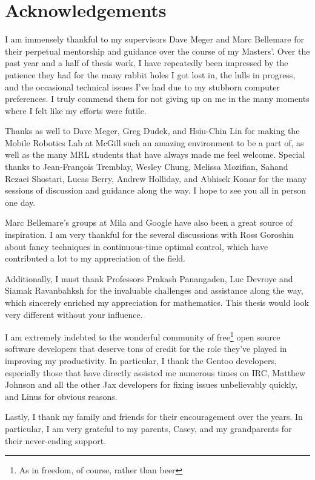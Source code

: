 \section*{Acknowledgements}
I am immensely thankful to my supervisors Dave Meger and Marc Bellemare for
their perpetual mentorship and guidance over the course of my Masters'. Over the
past year and a half of thesis work, I have repeatedly been impressed by
the patience they had for the many rabbit holes I got lost in, the lulls in
progress, and the occasional technical issues I've had due to my stubborn
computer preferences. I truly commend them for not giving up on me in the many
moments where I felt like my efforts were futile.

Thanks as well to Dave Meger, Greg Dudek, and Hsiu-Chin Lin for making the
Mobile Robotics Lab at McGill such an amazing environment to be a part of, as
well as the many MRL students that have always made me feel welcome. Special
thanks to Jean-François Tremblay, Wesley Chung, Melissa Mozifian, Sahand Rezaei
Shostari, Lucas Berry, Andrew Holliday, and Abhisek Konar for the many sessions
of discussion and guidance along the way. I hope to see you all in person one
day.

Marc Bellemare's groups at Mila and Google have also
been a great source of inspiration. I am very thankful for the several
discussions with Ross Goroshin about fancy techniques in continuous-time optimal
control, which have contributed a lot to my appreciation of the field. 

Additionally, I must thank Professors Prakash Panangaden, Luc Devroye and
Siamak Ravanbahksh for the invaluable challenges and assistance along the way,
which sincerely enriched my appreciation for mathematics. This thesis would look
very different without your influence.

I am extremely indebted to the wonderful community of free\footnote{As in
freedom, of course, rather than beer} open source software developers that
deserve tons of credit for the role they've played in improving my productivity.
In particular, I thank the Gentoo developers, especially those that have
directly assisted me numerous times on IRC, Matthew Johnson and all the
other Jax developers for fixing issues unbelievably quickly, and Linus for obvious
reasons.

Lastly, I thank my family and friends for their encouragement over the years. In
particular, I am very grateful to my parents, Casey, and my grandparents for
their never-ending support.

